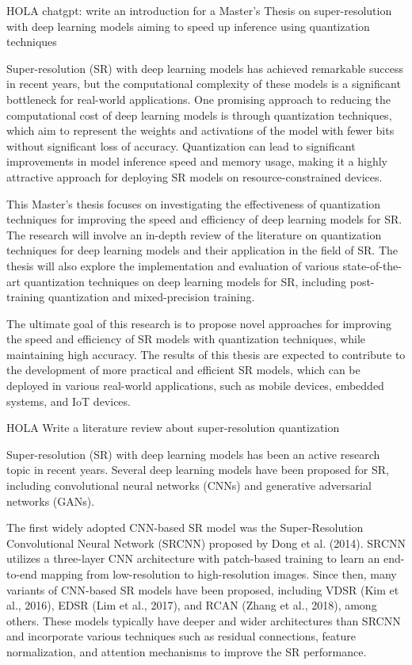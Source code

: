 \label{chap:introduction}

HOLA chatgpt: write an introduction for a Master's Thesis on super-resolution with deep learning models aiming to speed up inference using quantization techniques

Super-resolution (SR) with deep learning models has achieved remarkable success in recent years, but the computational complexity of these models is a significant bottleneck for real-world applications. One promising approach to reducing the computational cost of deep learning models is through quantization techniques, which aim to represent the weights and activations of the model with fewer bits without significant loss of accuracy. Quantization can lead to significant improvements in model inference speed and memory usage, making it a highly attractive approach for deploying SR models on resource-constrained devices.

This Master's thesis focuses on investigating the effectiveness of quantization techniques for improving the speed and efficiency of deep learning models for SR. The research will involve an in-depth review of the literature on quantization techniques for deep learning models and their application in the field of SR. The thesis will also explore the implementation and evaluation of various state-of-the-art quantization techniques on deep learning models for SR, including post-training quantization and mixed-precision training.

The ultimate goal of this research is to propose novel approaches for improving the speed and efficiency of SR models with quantization techniques, while maintaining high accuracy. The results of this thesis are expected to contribute to the development of more practical and efficient SR models, which can be deployed in various real-world applications, such as mobile devices, embedded systems, and IoT devices.

HOLA Write a literature review about super-resolution quantization

Super-resolution (SR) with deep learning models has been an active research topic in recent years. Several deep learning models have been proposed for SR, including convolutional neural networks (CNNs) and generative adversarial networks (GANs).

The first widely adopted CNN-based SR model was the Super-Resolution Convolutional Neural Network (SRCNN) proposed by Dong et al. (2014). SRCNN utilizes a three-layer CNN architecture with patch-based training to learn an end-to-end mapping from low-resolution to high-resolution images. Since then, many variants of CNN-based SR models have been proposed, including VDSR (Kim et al., 2016), EDSR (Lim et al., 2017), and RCAN (Zhang et al., 2018), among others. These models typically have deeper and wider architectures than SRCNN and incorporate various techniques such as residual connections, feature normalization, and attention mechanisms to improve the SR performance.

